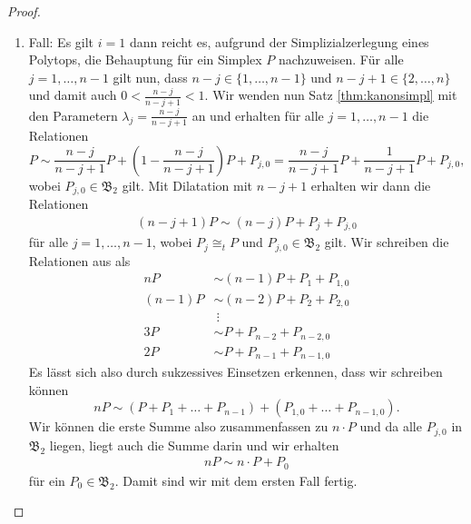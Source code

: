 \documentclass[11pt,titlepage]{article}
\theoremstyle{definition}
\theoremstyle{remark}
\begin{document}
	\begin{proof}
		\begin{enumerate}
			\item Fall: Es gilt $i=1$ dann reicht es, aufgrund 
			der Simplizialzerlegung eines Polytops, die 
			Behauptung für ein Simplex $P$ nachzuweisen. Für alle $j=1,\ldots,n-1$ 
			gilt nun, dass $n-j\in\{1,\ldots,n-1\}$ und $n-j+1\in\{2,\ldots,n\}$ 
			und damit auch $0<\frac{n-j}{n-j+1}<1$. Wir wenden nun  
			Satz \ref{thm:kanonsimpl} mit den Parametern 
			$\lambda_j=\frac{n-j}{n-j+1}$ an und 
			erhalten für alle $j=1,\ldots,n-1$ die Relationen 
			\[P\sim \frac{n-j}{n-j+1} P+\left(1-\frac{n-j}{n-j+1}\right)P+P_{j,0}
			=\frac{n-j}{n-j+1}P+\frac{1}{n-j+1}P+P_{j,0},\]
			wobei $P_{j,0}\in\mathfrak{B}_2$ gilt. Mit Dilatation mit 
			$n-j+1$ erhalten wir dann die Relationen 
			\begin{align*}
				(n-j +1)P\sim(n-j )P+P_j+P_{j, 0} 
			\end{align*}
			für alle $j=1,\ldots,n-1$, wobei $P_{j}\cong_t P$ und 
			$P_{j, 0}\in\mathfrak{B}_2$ gilt. Wir schreiben die Relationen 
			aus als
			\begin{align*}
				nP &\sim (n-1)P+P_1+P_{1,0} \\
				(n-1)P &\sim (n-2)P+P_2 +P_{2,0} \\
				&\ \vdots \\
				3P &\sim P +P_{n-2}+P_{n-2,0} \\
				2P &\sim P +P_{n-1}+P_{n-1,0}
			\end{align*}
			Es lässt sich also durch sukzessives Einsetzen erkennen, dass wir 
			schreiben können 
			\[nP\sim (P+P_1+\ldots+P_{n-1})+(P_{1,0}+\ldots+P_{n-1,0}).\]
			Wir können die erste Summe also zusammenfassen zu $n \cdot P$ 
			und da alle $P_{j,0}$ in $\mathfrak{B}_2$ liegen, liegt auch 
			die Summe darin und wir erhalten
			\begin{align}
				nP\sim n\cdot P+ P_0 \label{thm:zyl;1}
			\end{align}
			für ein $P_0\in\mathfrak{B}_2$. Damit sind wir mit dem 
			ersten Fall fertig.
			

\end{enumerate}
\end{proof}
\end{document}
